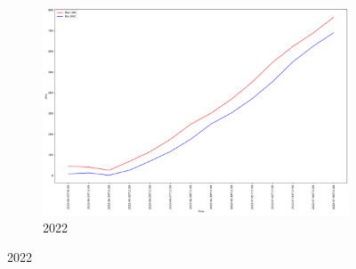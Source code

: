 \begin{figure}[h]
\begin{subfigure}{0.45\textwidth}
		\centering
		\includegraphics[width=\textwidth]{graphs/2022/DMC_maxMin.png}
		\caption{2022}
	\end{subfigure}
	
	\label{fig:daily_dmc_maxmin}
\end{figure}


